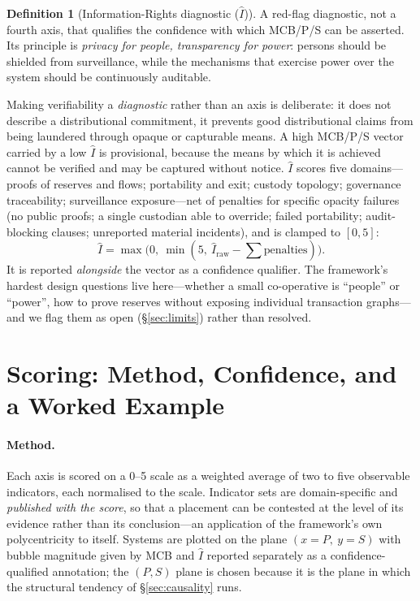 \documentclass[11pt]{article}
\theoremstyle{definition}
\newtheorem{definition}{Definition}
\newcommand{\Iax}{\ensuremath{\hat{I}}}
\begin{document}
\begin{definition}[Information-Rights diagnostic ($\Iax$)]
A red-flag diagnostic, not a fourth axis, that qualifies the confidence with which
MCB/P/S can be asserted. Its principle is \emph{privacy for people, transparency for
power}: persons should be shielded from surveillance, while the mechanisms that
exercise power over the system should be continuously auditable.
\end{definition}

Making verifiability a \emph{diagnostic} rather than an axis is deliberate: it does
not describe a distributional commitment, it prevents good distributional claims from
being laundered through opaque or capturable means. A high MCB/P/S vector carried by a
low $\Iax$ is provisional, because the means by which it is achieved cannot be
verified and may be captured without notice. $\Iax$ scores five domains---proofs of
reserves and flows; portability and exit; custody topology; governance traceability;
surveillance exposure---net of penalties for specific opacity failures (no public
proofs; a single custodian able to override; failed portability; audit-blocking
clauses; unreported material incidents), and is clamped to $[0,5]$:
\[
  \Iax = \max\!\bigl(0,\ \min(5,\ \Iax_{\text{raw}} - \textstyle\sum\text{penalties})\bigr).
\]
It is reported \emph{alongside} the vector as a confidence qualifier. The framework's
hardest design questions live here---whether a small co-operative is ``people'' or
``power'', how to prove reserves without exposing individual transaction graphs---and
we flag them as open (\S\ref{sec:limits}) rather than resolved.

\section{Scoring: Method, Confidence, and a Worked Example}
\label{sec:scoring}

\paragraph{Method.} Each axis is scored on a 0--5 scale as a weighted average of two
to five observable indicators, each normalised to the scale. Indicator sets are
domain-specific and \emph{published with the score}, so that a placement can be
contested at the level of its evidence rather than its conclusion---an application of
the framework's own polycentricity to itself. Systems are plotted on the plane
$(x = P,\ y = S)$ with bubble magnitude given by MCB and $\Iax$ reported separately
as a confidence-qualified annotation; the $(P,S)$ plane is chosen because it is the
plane in which the structural tendency of \S\ref{sec:causality} runs.
\end{document}
